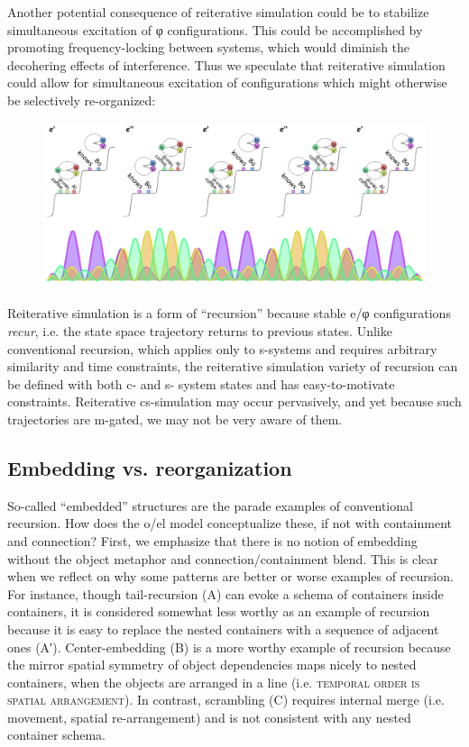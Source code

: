   Another potential consequence of reiterative simulation could be to stabilize simultaneous excitation of φ configurations. This could be accomplished by promoting frequency-locking between systems, which would diminish the decohering effects of interference. Thus we speculate that reiterative simulation could allow for simultaneous excitation of configurations which might otherwise be selectively re-organized:

  
\begin{figure}
\includegraphics[width=\textwidth]{figures/Tilsen-img117.png}
\caption{\missingcaption}
\label{fig:5:13}
\end{figure}
 

  Reiterative simulation is a form of “recursion” because stable e/φ configurations \textit{recur}, i.e. the state space trajectory returns to previous states. Unlike conventional recursion, which applies only to s-systems and requires arbitrary similarity and time constraints, the reiterative simulation variety of recursion can be defined with both c- and s- system states and has easy-to-motivate constraints. Reiterative cs-simulation may occur pervasively, and yet because such trajectories are m-gated, we may not be very aware of them. 

\subsection{Embedding vs. reorganization}

So-called “embedded” structures are the parade examples of conventional recursion. How does the o/el model conceptualize these, if not with containment and connection? First, we emphasize that there is no notion of embedding without the object metaphor and connection/containment blend. This is clear when we reflect on why some patterns are better or worse examples of recursion. For instance, though tail-recursion (A) can evoke a schema of containers inside containers, it is considered somewhat less worthy as an example of recursion because it is easy to replace the nested containers with a sequence of adjacent ones (A′). Center-embedding (B) is a more worthy example of recursion because the mirror spatial symmetry of object dependencies maps nicely to nested containers, when the objects are arranged in a line (i.e. \textsc{temporal order is spatial arrangement}). In contrast, scrambling (C) requires internal merge (i.e. movement, spatial re-arrangement) and is not consistent with any nested container schema.

